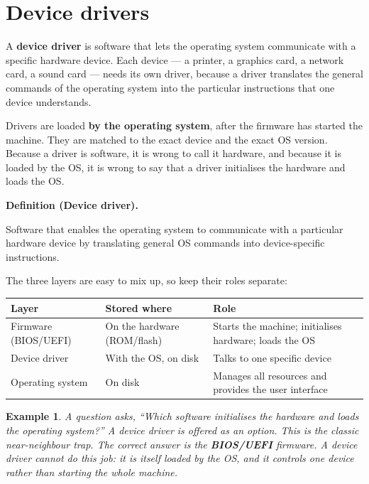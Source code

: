\documentclass[11pt]{article}
\newtheorem{example}{Example}[section]
\newenvironment{definitionbox}[1]{%
  \par\noindent\textbf{Definition (#1).}\ \itshape
}{\par\vspace{0.3em}}
\begin{document}
\section{Device drivers}
A \textbf{device driver} is software that lets the operating system
communicate with a specific hardware device. Each device --- a printer, a
graphics card, a network card, a sound card --- needs its own driver, because
a driver translates the general commands of the operating system into the
particular instructions that one device understands.

Drivers are loaded \textbf{by the operating system}, after the firmware has
started the machine. They are matched to the exact device and the exact OS
version. Because a driver is software, it is wrong to call it hardware, and
because it is loaded by the OS, it is wrong to say that a driver initialises
the hardware and loads the OS.

\begin{definitionbox}{Device driver}
Software that enables the operating system to communicate with a particular
hardware device by translating general OS commands into device-specific
instructions.
\end{definitionbox}

The three layers are easy to mix up, so keep their roles separate:

\begin{center}
\begin{tabular}{p{}p{}p{}}
\toprule
\textbf{Layer} & \textbf{Stored where} & \textbf{Role} \\
\midrule
Firmware (BIOS/UEFI) & On the hardware (ROM/flash) & Starts the machine; initialises hardware; loads the OS \\
Device driver & With the OS, on disk & Talks to one specific device \\
Operating system & On disk & Manages all resources and provides the user interface \\
\bottomrule
\end{tabular}
\end{center}

\begin{example}
A question asks, ``Which software initialises the hardware and loads the
operating system?'' A device driver is offered as an option. This is the
classic near-neighbour trap. The correct answer is the \textbf{BIOS/UEFI}
firmware. A device driver cannot do this job: it is itself loaded by the OS,
and it controls one device rather than starting the whole machine.
\end{example}
\end{document}
